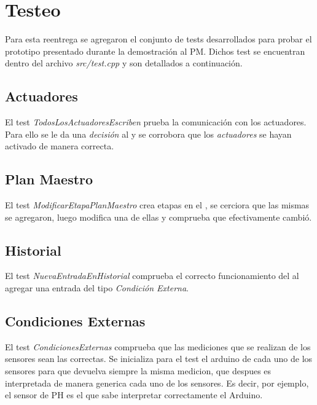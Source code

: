 \section{Testeo}

  Para esta reentrega se agregaron el conjunto de tests desarrollados para
  probar el prototipo presentado durante la demostraci\'on al PM. Dichos test
  se encuentran dentro del archivo \textit{src/test.cpp} y son detallados a
  continuaci\'on.

  \subsection{Actuadores}
    El test \textit{TodosLosActuadoresEscriben} prueba la comunicaci\'on con
    los actuadores. Para ello se le da una \textit{decisi\'on} al
    \manejadorAct{} y se corrobora que los \textit{actuadores} se hayan
    activado de manera correcta.

  \subsection{Plan Maestro}
    El test \textit{ModificarEtapaPlanMaestro} crea etapas en el \planmaestro{}
    , se cerciora que las mismas se agregaron, luego modifica una de ellas y
    comprueba que efectivamente cambi\'o.

  \subsection{Historial}
    El test \textit{NuevaEntradaEnHistorial} comprueba el correcto
    funcionamiento del \historial{} al agregar una entrada del tipo
    \textit{Condici\'on Externa}.

  \subsection{Condiciones Externas}
    El test \textit{CondicionesExternas} comprueba que las mediciones
    que se realizan de los sensores sean las correctas. Se inicializa para el test
    el arduino  de cada uno de los sensores para que devuelva siempre la misma medicion,
    que despues es interpretada de manera generica cada uno de los sensores. Es decir,
    por ejemplo, el sensor de PH es el que sabe interpretar correctamente el Arduino.
